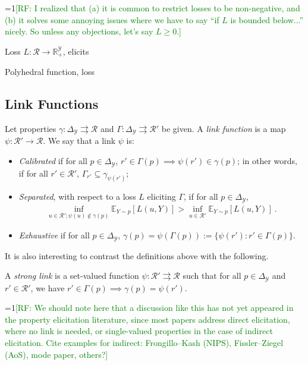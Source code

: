 \documentclass[11pt]{colt2019}
\newcommand{\Comments}{1}
\newcommand{\mynote}[2]{\ifnum\Comments=1\textcolor{#1}{#2}\fi}
\newcommand{\raf}[1]{\mynote{green}{[RF: #1]}}
\newcommand{\reals}{\mathbb{R}}
\newcommand{\simplex}{\Delta_\Y}
\newcommand{\E}{\mathbb{E}}
\newcommand{\R}{\mathcal{R}}
\newcommand{\Y}{\mathcal{Y}}
\newcommand{\toto}{\rightrightarrows}
\begin{document}
\begin{definition}
  \raf{I realized that (a) it is common to restrict losses to be non-negative, and (b) it solves some annoying issues where we have to say ``if $L$ is bounded below...'' nicely.  So unless any objections, let's say $L \geq 0$.}
  
  Loss $L:\R\to\reals^\Y_+$, elicits
\end{definition}

\begin{definition}
  Polyhedral function, loss
\end{definition}

\subsection{Link Functions}

\begin{definition}
  Let properties $\gamma:\simplex\toto\R$ and $\Gamma:\simplex\toto\R'$ be given.
  A \emph{link function} is a map $\psi:\R'\to\R$.
  We say that a link $\psi$ is:
  \begin{itemize}
  \item \emph{Calibrated} if for all $p\in\simplex$, $r'\in \Gamma(p) \implies \psi(r') \in \gamma(p)$; in other words, if for all $r'\in\R'$, $\Gamma_{r'} \subseteq \gamma_{\psi(r')}$;
  \item \emph{Separated}, with respect to a loss $L$ eliciting $\Gamma$, if for all $p \in \simplex$, 
  \begin{align*}
  \inf_{u \in \R'; \psi(u) \not \in \gamma(p)} \E_{Y\sim p}[L(u, Y)] > \inf_{u \in \R'}\E_{Y\sim p}[L(u, Y)]~.
  \end{align*}
  \item \emph{Exhaustive} if for all $p\in\simplex$, $\gamma(p) = \psi(\Gamma(p)) := \{\psi(r') : r'\in\Gamma(p)\}$.
  \end{itemize}
\end{definition}

It is also interesting to contrast the definitions above with the following.
\begin{definition}
  A \emph{strong link} is a set-valued function $\psi:\R'\toto\R$ such that for all $p\in\simplex$ and $r'\in\R'$, we have $r'\in\Gamma(p) \implies \gamma(p) = \psi(r')$.
\end{definition}

\raf{We should note here that a discussion like this has not yet appeared in the property elicitation literature, since most papers address direct elicitation, where no link is needed, or single-valued properties in the case of indirect elicitation.  Cite examples for indirect: Frongillo--Kash (NIPS), Fissler--Ziegel (AoS), mode paper, others?}
\end{document}
